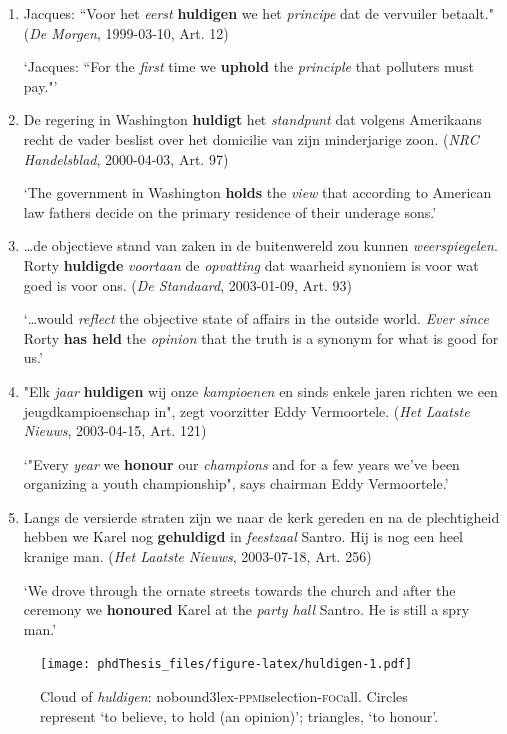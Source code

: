 \documentclass[
]{book}
\begin{document}
\begin{enumerate}
\def\labelenumi{(\arabic{enumi})}
\setcounter{enumi}{41}
\item
  Jacques: ``Voor het \emph{eerst} \textbf{huldigen} we het \emph{principe} dat de vervuiler betaalt." (\emph{De Morgen}, 1999-03-10, Art. 12)

  `Jacques: ``For the \emph{first} time we \textbf{uphold} the \emph{principle} that polluters must pay."'
\item
  De regering in Washington \textbf{huldigt} het \emph{standpunt} dat volgens Amerikaans recht de vader beslist over het domicilie van zijn minderjarige zoon. (\emph{NRC Handelsblad}, 2000-04-03, Art. 97)

  `The government in Washington \textbf{holds} the \emph{view} that according to American law fathers decide on the primary residence of their underage sons.'
\item
  \ldots de objectieve stand van zaken in de buitenwereld zou kunnen \emph{weerspiegelen}. Rorty \textbf{huldigde} \emph{voortaan} de \emph{opvatting} dat waarheid synoniem is voor wat goed is voor ons. (\emph{De Standaard}, 2003-01-09, Art. 93)

  `\ldots would \emph{reflect} the objective state of affairs in the outside world. \emph{Ever since} Rorty \textbf{has held} the \emph{opinion} that the truth is a synonym for what is good for us.'
\item
  "Elk \emph{jaar} \textbf{huldigen} wij onze \emph{kampioenen} en sinds enkele jaren richten we een jeugdkampioenschap in", zegt voorzitter Eddy Vermoortele. (\emph{Het Laatste Nieuws}, 2003-04-15, Art. 121)

  `"Every \emph{year} we \textbf{honour} our \emph{champions} and for a few years we've been organizing a youth championship", says chairman Eddy Vermoortele.'
\item
  Langs de versierde straten zijn we naar de kerk gereden en na de plechtigheid hebben we Karel nog \textbf{gehuldigd} in \emph{feestzaal} Santro. Hij is nog een heel kranige man. (\emph{Het Laatste Nieuws}, 2003-07-18, Art. 256)

  `We drove through the ornate streets towards the church and after the ceremony we \textbf{honoured} Karel at the \emph{party hall} Santro. He is still a spry man.'
\end{enumerate}



\begin{figure}
\centering
\texttt{[image: phdThesis\_files/figure-latex/huldigen-1.pdf]}
\caption{\label{fig:huldigen}Cloud of \emph{huldigen}: nobound3lex-\textsc{ppmi}selection-\textsc{foc}all. Circles represent `to believe, to hold (an opinion)'; triangles, `to honour'.}
\end{figure}
\end{document}
